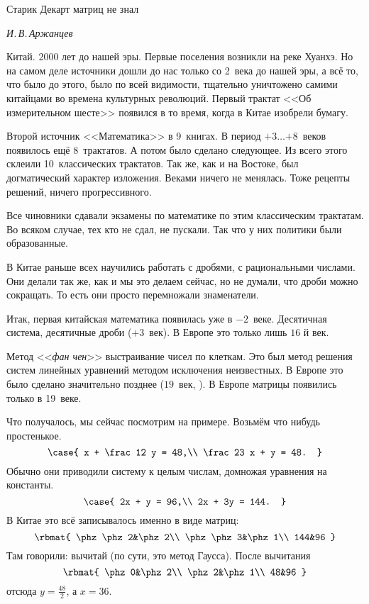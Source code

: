 \documentclass[a4paper,oneside,fleqn,10pt]{article}
\newcommand{\pe}[2]{${#1}\ldots{#2}$}
\begin{document}
\epigraph{Старик Декарт матриц не знал}{\emph{И.\,В.\,Аржанцев}}

Китай. 2000 лет до нашей эры. Первые поселения возникли на реке
Хуанхэ.  Но на самом деле источники дошли до нас только со 2~века до
нашей эры, а всё то, что было до этого, было по всей видимости,
тщательно уничтожено самими китайцами во времена культурных революций.
Первый трактат <<Об измерительном шесте>> появился в то время, когда в
Китае изобрели бумагу.

Второй источник <<Математика>> в 9~книгах. В период \pe{+3}{+8}~веков
появилось ещё 8~трактатов.  А потом было сделано следующее. Из всего
этого склеили 10~классических трактатов.  Так же, как и на Востоке,
был догматический характер изложения.  Веками ничего не менялась. Тоже
рецепты решений, ничего прогрессивного.

Все чиновники сдавали экзамены по математике по этим классическим
трактатам.  Во всяком случае, тех кто не сдал, не пускали. Так что у
них политики были образованные.

В Китае раньше всех научились работать с дробями, с рациональными
числами.  Они делали так же, как и мы это делаем сейчас, но не думали,
что дроби можно сокращать.  То есть они просто перемножали
знаменатели.

Итак, первая китайская математика появилась уже в $-2$~веке.
Десятичная система, десятичные дроби ($+3$~век).  В Европе это только
лишь $16$ й век.

Метод <<\emph{фан чен}>> выстраивание чисел по клеткам.  Это был метод
решения систем линейных уравнений методом исключения неизвестных. В
Европе это было сделано значительно позднее ($19$~век, ).
В Европе матрицы появились только в 19~веке.

Что получалось, мы сейчас посмотрим на примере. Возьмём что нибудь
простенькое.
$$ \case{ x + \frac12 y = 48,\\ \frac23 x + y = 48.  }
$$ Обычно они приводили систему к целым числам, домножая уравнения на
константы.
$$ \case{ 2x + y = 96,\\ 2x + 3y = 144.  }
$$ В Китае это всё записывалось именно в виде матриц:
$$ \rbmat{ \phz\phz2&\phz2\\ \phz\phz3&\phz1\\ 144&96 }
$$ Там говорили: вычитай (по сути, это метод Гаусса). После вычитания
$$ \rbmat{ \phz0&\phz2\\ \phz2&\phz1\\ 48&96 }
$$ отсюда $y = \frac{48}{2}$, а $x = 36$.
\end{document}
